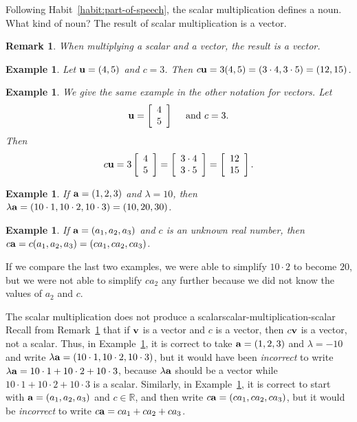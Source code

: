 \documentclass{book}
\newcounter{ekcounter}%
\theoremstyle{ekimcustom}
\newtheorem{example}[ekcounter]{Example}
\newtheorem{remark}[ekcounter]{Remark}
\begin{document}
Following Habit~\ref{habit:part-of-speech}, the scalar multiplication defines a noun. What kind of noun? The result of scalar multiplication is a vector.
\begin{remark}\label{remark:scalar-multiplication-is-vector}
When multiplying a scalar and a vector, the result is a vector.
\end{remark}
\begin{example}
Let ${\bf u} = (4,5)$ and $c=3$. Then $c{\bf u} = 3(4,5)=(3\cdot4,3\cdot5)=(12,15)$.
\end{example}
\begin{example}
We give the same example in the other notation for vectors. Let 
\[{\bf u} = \left[\begin{array}{c}4\\5\end{array}\right] \quad\text{ and } c=3.\]
Then 
\[
c{\bf u} 
=
3\left[\begin{array}{c}4\\5\end{array}\right]
=
\left[\begin{array}{c}3 \cdot 4\\3 \cdot 5\end{array}\right]
=
\left[\begin{array}{c}12\\15\end{array}\right].
\]
\end{example}
\begin{example}\label{example:sm-r3}
If ${\bf a} = (1,2,3)$ and $\lambda = 10$, then $\lambda{\bf a} = (10 \cdot 1, 10 \cdot 2, 10 \cdot 3) = (10,20,30)$.
\end{example}
\begin{example}\label{example:sm-r3-generic}
If ${\bf a} = (a_1,a_2,a_3)$ and $c$ is an unknown real number, then $c{\bf a}= c(a_1,a_2,a_3)=(ca_1,ca_2,ca_3)$.
\end{example}
If we compare the last two examples, we were able to simplify $10 \cdot 2$ to become $20$, but we were not able to simplify $ca_2$ any further because we did not know the values of $a_2$ and $c$.
\begin{bwarning}{The scalar multiplication does not produce a scalar}{scalar-multiplication-scalar}
Recall from Remark~\ref{remark:scalar-multiplication-is-vector} that if ${\bf v}$ is a vector and $c$ is a vector, then $c{\bf v}$ is a vector, not a scalar.
\vskip6pt
Thus, in Example~\ref{example:sm-r3}, it is correct to take ${\bf a} = (1,2,3)$ and $\lambda = -10$ and write $\lambda{\bf a} =  (10 \cdot 1, 10 \cdot 2, 10 \cdot 3)$, but it would have been \emph{incorrect} to write $\lambda{\bf a} = 10 \cdot 1 + 10 \cdot 2 + 10 \cdot 3$, because $\lambda{\bf a}$ should be a vector while $10 \cdot 1 + 10 \cdot 2 + 10 \cdot 3$ is a scalar.
\vskip6pt
Similarly, in Example~\ref{example:sm-r3-generic}, it is correct to start with ${\bf a} = (a_1,a_2,a_3)$ and $c \in \mathbb{R}$, and then write $c{\bf a} = (ca_1,ca_2,ca_3)$, but it would be \emph{incorrect} to write $c{\bf a} = ca_1+ca_2+ca_3$.
\end{bwarning}
\end{document}
